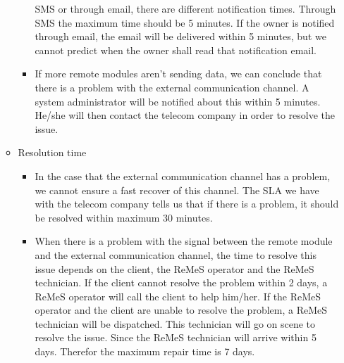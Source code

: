 \begin{itemize}
\begin{itemize}
\begin{itemize}
							SMS or through email, there are different notification times. Through SMS the maximum time should be 5 minutes. If the owner is notified
							through email, the email will be delivered within 5 minutes, but we cannot predict when the owner shall read that notification email.
					\item If more remote modules aren't sending data, we can conclude that there is a problem with the external communication channel. A system administrator
							will be notified about this within 5 minutes. He/she will then contact the telecom company in order to resolve the issue.
				\end{itemize}
			\item Resolution time
				\begin{itemize}
					\item In the case that the external communication channel has a problem, we cannot ensure a fast recover of this channel. The SLA we have with the
							telecom company tells us that if there is a problem, it should be resolved within maximum 30 minutes.
					\item When there is a problem with the signal between the remote module and the external communication channel, the time to resolve this issue depends
							on the client, the ReMeS operator and the ReMeS technician. If the client cannot resolve the problem within 2 days, a ReMeS operator will call the client to
							help him/her. If the ReMeS operator and the client are unable to resolve the problem, a ReMeS technician will be dispatched. This technician will
							go on scene to resolve the issue. Since the ReMeS technician will arrive within 5 days. Therefor the maximum repair time is 7 days.
				\end{itemize}
		\end{itemize}
\end{itemize}